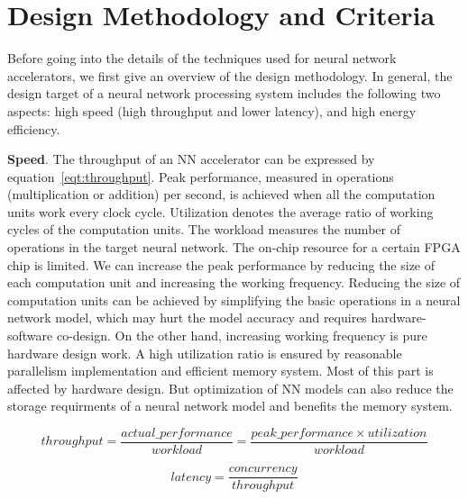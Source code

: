 \section{Design Methodology and Criteria}\label{sec:design_method}

Before going into the details of the techniques used for neural network accelerators, we first give an overview of the design methodology. In general, the design target of a neural network processing system includes the following two aspects: high speed (high throughput and lower latency), and high energy efficiency.

\textbf{Speed}. The throughput of an NN accelerator can be expressed by equation~\ref{eqt:throughput}. Peak performance, measured in operations (multiplication or addition) per second, is achieved when all the computation units work every clock cycle. Utilization denotes the average ratio of working cycles of the computation units. The workload measures the number of operations in the target neural network. The on-chip resource for a certain FPGA chip is limited. We can increase the peak performance by reducing the size of each computation unit and increasing the working frequency. Reducing the size of computation units can be achieved by simplifying the basic operations in a neural network model, which may hurt the model accuracy and requires hardware-software co-design. On the other hand, increasing working frequency is pure hardware design work. A high utilization ratio is ensured by reasonable parallelism implementation and efficient memory system. Most of this part is affected by hardware design. But optimization of NN models can also reduce the storage requirments of a neural network model and benefits the memory system.

\begin{equation}\label{eqt:throughput}
    throughput = \frac{actual\_performance}{workload} = \frac{peak\_performance \times utilization}{workload}
\end{equation}


\begin{equation}\label{eqt:latency}
    latency = \frac{concurrency}{throughput}
\end{equation}

